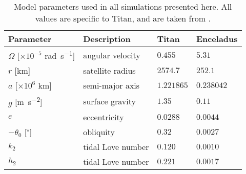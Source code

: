 \begin{table}[!t]
\scriptsize
\centering
\begin{tabularx}{\linewidth}{p{1.8cm} p{2cm} p{1cm} p{1.2cm}}
 \toprule
Parameter & Description & Titan & Enceladus\\
 \midrule \midrule
$\Omega$ [$\times 10^{-5}$ \si{\radian\per\second}]	& angular velocity 		& $0.455$ & $5.31 $ \\
$r$ [\si{\kilo\metre}]				& satellite radius 		& $2574.7$ & $252.1$\\
$a$ [$\times 10^6$ \si{\kilo\metre}]				& semi-major axis 		& $1.221865$ & $0.238042$\\
$g$ [\si{\metre\per\second\squared}]		& surface gravity 		& $1.35$ & $0.11$\\
$e$ 								& eccentricity 			& $0.0288$ & $0.0044$\\
$-\theta_0$ [$^{\circ}$] 			& obliquity 			& $0.32$ & $0.0027$\\
$k_2$ 								& tidal Love number 	& $0.120$ & $0.0010$\\
$h_2$ 								& tidal Love number 	& $0.221$ & $0.0017$\\
 \bottomrule
\end{tabularx}
\caption{Model parameters used in all simulations presented here. All values are specific to Titan, and are taken from \citet{zebker2009size,chen2013tidal}.  \label{tb:param}}
\end{table}